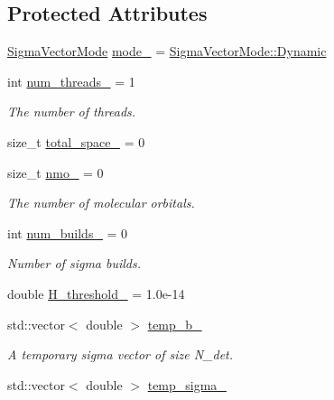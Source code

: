 \subsection*{Protected Attributes}
\begin{DoxyCompactItemize}
\item 
\mbox{\hyperlink{namespaceforte_a03c165703ac6571c2ec6f966a6153a22}{Sigma\+Vector\+Mode}} \mbox{\hyperlink{classforte_1_1_sigma_vector_dynamic_a59caf3c83ac63c2b8d887db073f5a3bf}{mode\+\_\+}} = \mbox{\hyperlink{namespaceforte_a94410e08f0cf9a0cfc5e53c70b6bf485a971fd8cc345d8bd9f92e9f7d88fdf20c}{Sigma\+Vector\+Mode\+::\+Dynamic}}
\item 
int \mbox{\hyperlink{classforte_1_1_sigma_vector_dynamic_ad03b41c577c98bd0c9db4073b0edd941}{num\+\_\+threads\+\_\+}} = 1
\begin{DoxyCompactList}\small\item\em The number of threads. \end{DoxyCompactList}\item 
size\+\_\+t \mbox{\hyperlink{classforte_1_1_sigma_vector_dynamic_ab539f0ab423f45b066cb8e38d768f9ca}{total\+\_\+space\+\_\+}} = 0
\item 
size\+\_\+t \mbox{\hyperlink{classforte_1_1_sigma_vector_dynamic_aec67a684199133a8b6abcd72a3b33991}{nmo\+\_\+}} = 0
\begin{DoxyCompactList}\small\item\em The number of molecular orbitals. \end{DoxyCompactList}\item 
int \mbox{\hyperlink{classforte_1_1_sigma_vector_dynamic_ac168a907aeb0425a36e03d8cc85afbdc}{num\+\_\+builds\+\_\+}} = 0
\begin{DoxyCompactList}\small\item\em Number of sigma builds. \end{DoxyCompactList}\item 
double \mbox{\hyperlink{classforte_1_1_sigma_vector_dynamic_a479e1be73df53e5fa3f7317121decf1e}{H\+\_\+threshold\+\_\+}} = 1.\+0e-\/14
\item 
std\+::vector$<$ double $>$ \mbox{\hyperlink{classforte_1_1_sigma_vector_dynamic_a4007a610353c66220f0b9d939b3a03d2}{temp\+\_\+b\+\_\+}}
\begin{DoxyCompactList}\small\item\em A temporary sigma vector of size N\+\_\+det. \end{DoxyCompactList}\item 
std\+::vector$<$ double $>$ \mbox{\hyperlink{classforte_1_1_sigma_vector_dynamic_ad99b90c2620a933dc06db419077a6910}{temp\+\_\+sigma\+\_\+}}

\end{DoxyCompactItemize}
